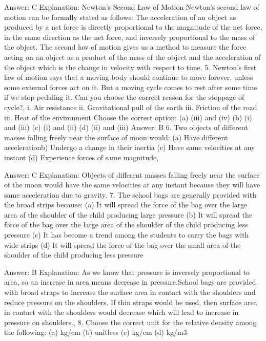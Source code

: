 Answer: C
Explanation: Newton’s Second Law of Motion Newton’s second law of motion can be formally stated as follows: The acceleration of an object as produced by a net force is directly proportional to the magnitude of the net force, in the same direction as the net force, and inversely proportional to the mass of the object. The second law of motion gives us a method to measure the force acting on an object as a product of the mass of the object and the acceleration of the object which is the change in velocity with respect to time. 5. Newton’s first law of motion says that a moving body should continue to move forever, unless some external forces act on it. But a moving cycle comes to rest after some time if we stop pedaling it. Can you choose the correct reason for the stoppage of cycle?,  i. Air resistance ii. Gravitational pull of the earth iii. Friction of the road iii. Heat of the environment Choose the correct option: (a) (iii) and (iv) (b) (i) and (iii) (c) (i) and (ii) (d) (ii) and (iii) 
Answer: B 6. Two objects of different masses falling freely near the surface of moon would: (a) Have 
different accelerationb) Undergo a change in their inertia (c) Have same velocities at any instant (d) Experience forces of same magnitude,  

Answer: C
Explanation: Objects of different masses falling freely near the surface of the moon would have the same velocities at any instant because they will have same acceleration due to gravity. 7. The school bags are generally provided with the broad strips because: (a) It will spread the force of the bag over the large area of the shoulder of the child producing large pressure (b) It will spread the force of the bag over the large area of the shoulder of the child producing less pressure (c) It has become a trend among the students to carry the bags with wide strips (d) It will spread the force of the bag over the small area of the shoulder of the child producing less pressure 

Answer: B
Explanation: As we know that pressure is inversely proportional to area, so an increase in area means decrease in pressure.School bags are provided with broad straps to increase the surface area in contact with the shoulders and reduce pressure on the shoulders. If thin straps would be used, then surface area in contact with the shoulders would decrease which will lead to increase in pressure on shoulders.,  8. Choose the correct unit for the relative density among the following: (a) kg/cm (b) unitless (c) kg/cm (d) kg/m3 


